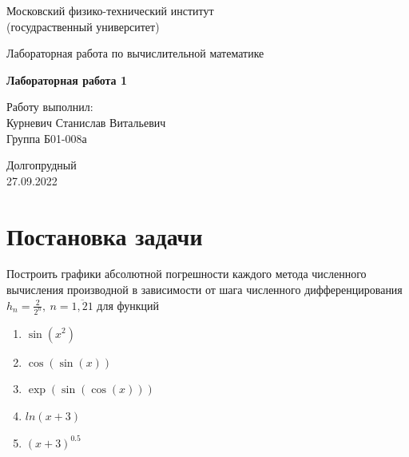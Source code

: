 \documentclass[a4paper,11.5pt]{article} %
\begin{document}
	
	
	\begin{titlepage}
		
		\newpage
		\begin{center}
			\normalsize Московский физико-технический институт \\(госудраственный 			университет)
		\end{center}
		
		\vspace{6em}
		
		\begin{center}
			\Large Лабораторная работа по вычислительной математике\\
		\end{center}
		
		\vspace{1em}
		
		\begin{center}
			\large \textbf{Лабораторная работа 1}
		\end{center}
		
		\vspace{2em}
		
		\begin{center}
			\large Работу выполнил:\\	
			Курневич Станислав Витальевич\\
			Группа Б01-008а
		\end{center}
		
		\vspace{\fill}
		
		\begin{center}
			Долгопрудный \\27.09.2022
		\end{center}
		
	\end{titlepage}
	
	
    \section{Постановка задачи}
    
    Построить графики абсолютной погрешности каждого метода численного вычисления производной в зависимости от шага численного дифференцирования $h_n = \frac{2}{2^n},~ n = \overline{1, 21}$ для функций
    \begin{enumerate}
        \item $\sin(x^2)$
        \item $\cos(\sin(x))$
        \item $\exp(\sin(\cos(x)))$
        \item $ln(x + 3)$
        \item $(x + 3)^{0.5}$
    \end{enumerate}
\end{document}
